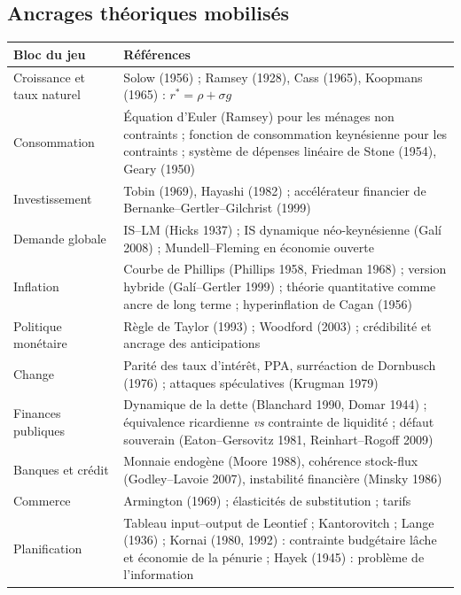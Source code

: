 \documentclass[11pt,a4paper]{article}
\begin{document}
\subsection{Ancrages théoriques mobilisés}
\begin{center}\small
\begin{tabular}{p{4.6cm}p{10.4cm}}
\toprule
\textbf{Bloc du jeu} & \textbf{Références}\\
\midrule
Croissance et taux naturel & Solow (1956) ; Ramsey (1928), Cass (1965), Koopmans (1965) : $r^\ast = \rho + \sigma g$ \\
Consommation & Équation d'Euler (Ramsey) pour les ménages non contraints ; fonction de consommation keynésienne pour les contraints ; système de dépenses linéaire de Stone (1954), Geary (1950)\\
Investissement & Tobin (1969), Hayashi (1982) ; accélérateur financier de Bernanke--Gertler--Gilchrist (1999)\\
Demande globale & IS--LM (Hicks 1937) ; IS dynamique néo-keynésienne (Galí 2008) ; Mundell--Fleming en économie ouverte\\
Inflation & Courbe de Phillips (Phillips 1958, Friedman 1968) ; version hybride (Galí--Gertler 1999) ; théorie quantitative comme ancre de long terme ; hyperinflation de Cagan (1956)\\
Politique monétaire & Règle de Taylor (1993) ; Woodford (2003) ; crédibilité et ancrage des anticipations\\
Change & Parité des taux d'intérêt, PPA, surréaction de Dornbusch (1976) ; attaques spéculatives (Krugman 1979)\\
Finances publiques & Dynamique de la dette (Blanchard 1990, Domar 1944) ; équivalence ricardienne \emph{vs} contrainte de liquidité ; défaut souverain (Eaton--Gersovitz 1981, Reinhart--Rogoff 2009)\\
Banques et crédit & Monnaie endogène (Moore 1988), cohérence stock-flux (Godley--Lavoie 2007), instabilité financière (Minsky 1986)\\
Commerce & Armington (1969) ; élasticités de substitution ; tarifs\\
Planification & Tableau input--output de Leontief ; Kantorovitch ; Lange (1936) ; Kornai (1980, 1992) : contrainte budgétaire lâche et économie de la pénurie ; Hayek (1945) : problème de l'information\\
\bottomrule
\end{tabular}
\end{center}
\end{document}
